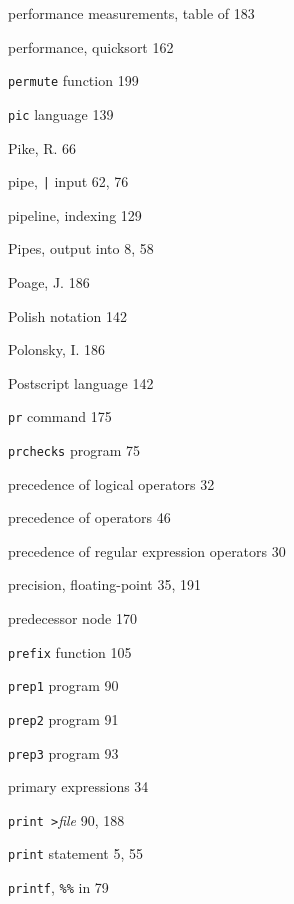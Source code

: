 \begin{multicols}{3}
\hangindent=3pc  performance measurements, table of 183

\hangindent=3pc  performance, quicksort 162

\hangindent=3pc  \verb'permute' function 199

\hangindent=3pc  \verb'pic' language 139

\hangindent=3pc  Pike, R. 66

\hangindent=3pc  pipe, \verb'|' input 62, 76

\hangindent=3pc  pipeline, indexing 129

\hangindent=3pc  Pipes, output into 8, 58

\hangindent=3pc  Poage, J. 186

\hangindent=3pc  Polish notation 142

\hangindent=3pc  Polonsky, I. 186

\hangindent=3pc  Postscript language 142

\hangindent=3pc  \verb'pr' command 175

\hangindent=3pc  \verb'prchecks' program 75

\hangindent=3pc  precedence of logical operators 32

\hangindent=3pc  precedence of operators 46

\hangindent=3pc  precedence of regular expression operators 30

\hangindent=3pc  precision, floating-point 35, 191

\hangindent=3pc  predecessor node 170

\hangindent=3pc  \verb'prefix' function 105

\hangindent=3pc  \verb'prep1' program 90

\hangindent=3pc  \verb'prep2' program 91

\hangindent=3pc  \verb'prep3' program 93

\hangindent=3pc  primary expressions 34

\hangindent=3pc  \verb'print >'\textit{file} 90, 188

\hangindent=3pc  \verb'print' statement 5, 55

\hangindent=3pc  \verb'printf', \verb'%%' in 79


\end{multicols}
